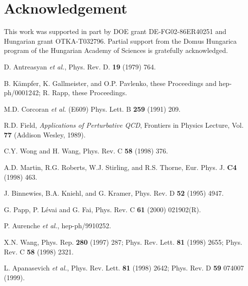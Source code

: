 \section{Acknowledgement}

This work was supported in part by DOE grant DE-FG02-86ER40251 and 
Hungarian grant OTKA-T032796. Partial
support from the Domus Hungarica program of the Hungarian Academy of Sciences 
is gratefully acknowledged. 

\begin{thebibliography}{99}
\itemsep=0cm

D. Antreasyan {\it et al.}, Phys. Rev. D. {\bf 19} (1979) 764.

B. K{\"a}mpfer, K. Gallmeister, and O.P. Pavlenko, these Proceedings
and hep-ph/0001242;
R. Rapp, these Proceedings.

M.D. Corcoran {\it et al.} (E609) Phys. Lett. B {\bf 259} (1991) 209.

R.D. Field, {\it Applications of Perturbative QCD},
Frontiers in Physics Lecture, Vol. {\bf 77} (Addison Wesley, 1989).

C.Y. Wong and H. Wang, Phys. Rev. C {\bf 58} (1998) 376.

A.D. Martin, R.G. Roberts, W.J. Stirling, and R.S. Thorne,
Eur. Phys. J. {\bf C4} (1998) 463.

J. Binnewies, B.A. Kniehl, and G. Kramer, Phys. Rev. D {\bf 52} (1995) 4947.

G. Papp, P. L\'evai and G. Fai, Phys. Rev. C {\bf 61} (2000) 021902(R).

P. Aurenche {\it et al.}, hep-ph/9910252. 

X.N. Wang, Phys. Rep. {\bf 280} (1997) 287; Phys. Rev. Lett. {\bf 81} (1998) 2655;
Phys. Rev. C {\bf 58} (1998) 2321.
 
L. Apanasevich {\it et al.}, Phys. Rev. Lett. {\bf 81} (1998) 2642;
Phys. Rev. D {\bf 59} 074007 (1999). \\ 


\end{thebibliography}


